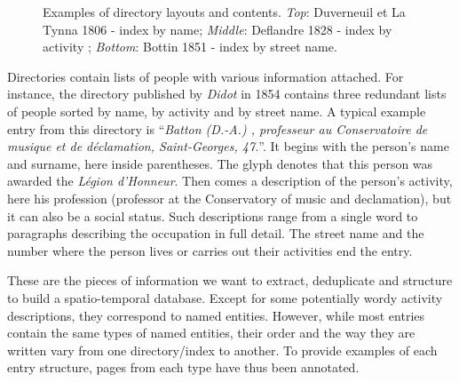 \begin{figure}[htb!]
	  \caption{\label{fig:directories} Examples of directory layouts and contents. \emph{Top}: Duverneuil et La Tynna 1806 - index by name; \emph{Middle}: Deflandre 1828 - index by activity ; \emph{Bottom}: Bottin 1851 - index by street name.}
\end{figure}


Directories contain lists of people with various information attached.
For instance, the directory published by \emph{Didot} in 1854 contains three redundant lists of people sorted by name, by activity and by street name.
A typical example entry from this directory is ``\textit{Batton (D.-A.) , professeur au Conservatoire de musique et de déclamation, Saint-Georges, 47.}''.
It begins with the person's name and surname, here inside parentheses.
The glyph denotes that this person was awarded the \textit{Légion d'Honneur}.
Then comes a description of the person's activity, here his profession (professor at the Conservatory of music and declamation), but it can also be a social status.
Such descriptions range from a single word to paragraphs describing the occupation in full detail.
The street name and the number where the person lives or carries out their activities end the entry.

These are the pieces of information we want to extract, deduplicate and structure to build a spatio-temporal database.
Except for some potentially wordy activity descriptions, they correspond to named entities. However, while most entries contain the same types of named entities, their order and the way they are written vary from one directory/index to another. To provide examples of each entry structure, pages from each type have thus been annotated. %


